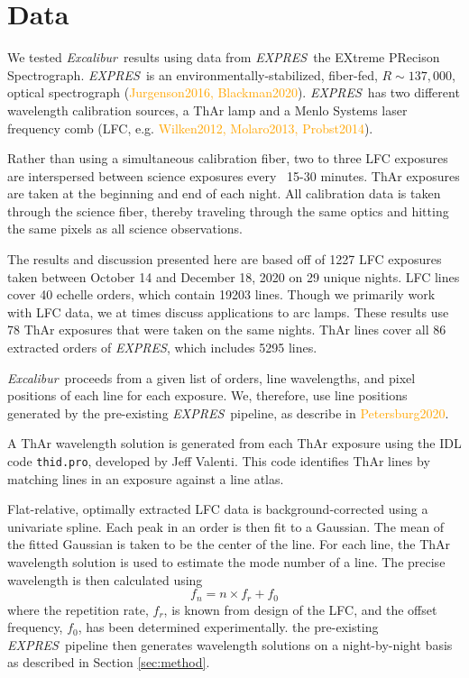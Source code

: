 \documentclass[twocolumn]{aastex63}
\newcommand{\lz}[1]{\textcolor{orange}{#1}}
\newcommand{\project}[1]{\textsl{#1}}
\newcommand{\name}{\project{Excalibur}}
\newcommand{\acronym}[1]{{\small{#1}}}
\newcommand{\expres}{\project{\acronym{EXPRES}}}
\begin{document}
\section{Data} \label{sec:data}
We tested \name\ results using data from \expres\, the EXtreme PRecison Spectrograph.  \expres\ is an environmentally-stabilized, fiber-fed, $R\sim137,000$, optical spectrograph (\lz{Jurgenson2016, Blackman2020}).  \expres\ has two different wavelength calibration sources, a ThAr lamp and a Menlo Systems laser frequency comb (LFC, e.g. \lz{Wilken2012, Molaro2013, Probst2014}).

Rather than using a simultaneous calibration fiber, two to three LFC exposures are interspersed between science exposures every ~15-30 minutes.  ThAr exposures are taken at the beginning and end of each night.  All calibration data is taken through the science fiber, thereby traveling through the same optics and hitting the same pixels as all science observations.

The results and discussion presented here are based off of 1227 LFC exposures taken between October 14 and December 18, 2020 on 29 unique nights.  LFC lines cover 40 echelle orders, which contain 19203 lines.  Though we primarily work with LFC data, we at times discuss applications to arc lamps.  These results use 78 ThAr exposures that were taken on the same nights.  ThAr lines cover all 86 extracted orders of \expres, which includes 5295 lines.

 \name\ proceeds from a given list of orders, line wavelengths, and pixel positions of each line for each exposure.  We, therefore, use line positions generated by the pre-existing \expres\ pipeline, as describe in \lz{Petersburg2020}.
 
 A ThAr wavelength solution is generated from each ThAr exposure using the IDL code \texttt{thid.pro}, developed by Jeff Valenti.  This code identifies ThAr lines by matching lines in an exposure against a line atlas. 
 
 Flat-relative, optimally extracted LFC data is background-corrected using a univariate spline.  Each peak in an order is then fit to a Gaussian.  The mean of the fitted Gaussian is taken to be the center of the line.  For each line, the ThAr wavelength solution is used to estimate the mode number of a line.  The precise wavelength is then calculated using
 \begin{equation}
 f_n = n \times  f_r + f_0
 \label{eq:lfc}
 \end{equation}
 where the repetition rate, $f_r$, is known from design of the LFC, and the offset frequency, $f_0$, has been determined experimentally.  the pre-existing \expres\ pipeline then generates wavelength solutions on a night-by-night basis as described in Section \ref{sec:method}.
 
\end{document}
